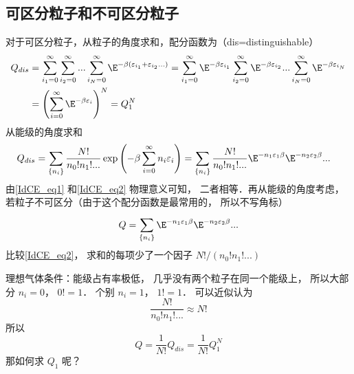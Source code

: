 
\subsection{可区分粒子和不可区分粒子}
对于可区分粒子，从粒子的角度求和，配分函数为（dis=distinguishable）
\begin{equation}\label{IdCE_eq1}
\begin{aligned}
{Q_{dis}} & = \sum\limits_{{i_1} = 0}^\infty  {\sum\limits_{{i_2} = 0}^\infty  {...\sum\limits_{{i_N} = 0}^\infty  {{\E^{ - \beta ({\varepsilon_{{i_1}}} + {\varepsilon_{{i_2}}}...)}}} } } = \sum\limits_{{i_1} = 0}^\infty  {{\E^{ - \beta {\varepsilon_{{i_1}}}}}} \sum\limits_{{i_2} = 0}^\infty  {{\E^{ - \beta {\varepsilon_{{i_2}}}}}} ...\sum\limits_{{i_N} = 0}^\infty  {{\E^{ - \beta {\varepsilon_{{i_N}}}}}} \\
& = {\left( {\sum\limits_{i = 0}^\infty  {{\E^{ - \beta {\varepsilon_i}}}} } \right)^N}= Q_1^N
\end{aligned}
\end{equation}
从能级的角度求和
\begin{equation}\label{IdCE_eq2}
\begin{aligned}
{Q_{dis}} & = \sum\limits_{\{ {n_i}\} }^{} {\frac{{N!}}{{{n_0}!{n_1}!...}}\exp \left( { - \beta \sum\limits_{i = 0}^\infty  {{n_i}{\varepsilon_i}} } \right)} = \sum\limits_{\{ {n_i}\} }^{} {\frac{{N!}}{{{n_0}!{n_1}!...}}{\E^{ - {n_1}{\varepsilon_1}\beta }}{\E^{ - {n_2}{\varepsilon_2}\beta }}...}
\end{aligned}
\end{equation}
由\autoref{IdCE_eq1} 和\autoref{IdCE_eq2} 物理意义可知， 二者相等．再从能级的角度考虑， 若粒子不可区分（由于这个配分函数是最常用的， 所以不写角标）
\begin{equation}\label{IdCE_eq3}
Q = \sum\limits_{\{ {n_i}\} }^{} {{\E^{ - {n_1}{\varepsilon_1}\beta }}{\E^{ - {n_2}{\varepsilon_2}\beta }}...}
\end{equation}
比较\autoref{IdCE_eq2}，  求和的每项少了一个因子 ${{N!}}/({{{n_0}!{n_1}!...}})$

理想气体条件：能级占有率极低， 几乎没有两个粒子在同一个能级上， 所以大部分 ${n_i} = 0$，  $0! = 1$．  个别 ${n_i} = 1$，  $1! = 1$．
可以近似认为
\begin{equation}
\frac{{N!}}{{{n_0}!{n_1}!...}} \approx N!
\end{equation}
所以
\begin{equation}
Q = \frac{1}{{N!}}{Q_{dis}} = \frac{1}{{N!}}Q_1^N
\end{equation}
那如何求 $Q_1$ 呢？ 

